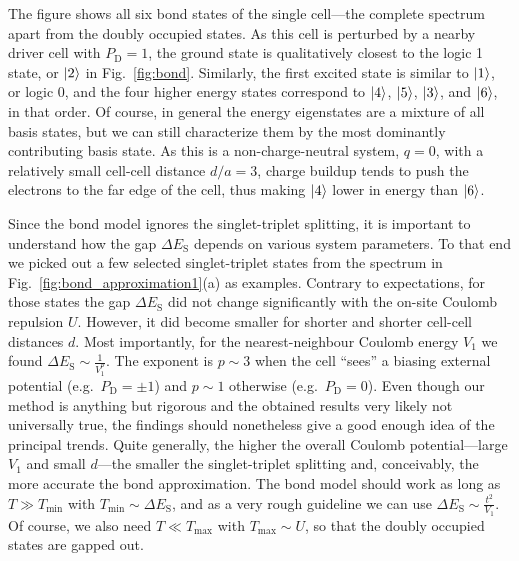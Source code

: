 The figure shows all six bond states of the single cell---the complete spectrum
apart from the doubly occupied states. As this cell is perturbed by a nearby
driver cell with $P_\text{D} = 1$, the ground state is qualitatively closest to the
logic 1 state, or $\left|2\right>$ in Fig.~\ref{fig:bond}. Similarly, the first excited
state is similar to $\left|1\right>$, or logic 0, and the four higher energy states
correspond to $\left|4\right>$, $\left|5\right>$, $\left|3\right>$, and $\left|6\right>$, in that order. Of
course, in general the energy eigenstates are a mixture of all basis states, but
we can still characterize them by the most dominantly contributing basis state.
As this is a non-charge-neutral system, $q=0$, with a relatively small cell-cell
distance $d/a = 3$, charge buildup tends to push the electrons to the far edge
of the cell, thus making $\left|4\right>$ lower in energy than $\left|6\right>$.

Since the bond model ignores the singlet-triplet splitting, it is important to
understand how the gap $\Delta E_\text{S}$ depends on various system parameters. To
that end we picked out a few selected singlet-triplet states from the spectrum
in Fig.~\ref{fig:bond_approximation1}(a) as examples. Contrary to expectations,
for those states the gap $\Delta E_\text{S}$ did not change significantly with the
on-site Coulomb repulsion $U$. However, it did become smaller for shorter and
shorter cell-cell distances $d$. Most importantly, for the nearest-neighbour
Coulomb energy $V_1$ we found $\Delta E_\text{S} \sim \frac{1}{V_1^p}$. The exponent is
$p \sim 3$ when the cell ``sees'' a biasing external potential (e.g.\ $P_\text{D} = \pm
1$) and $p \sim 1$ otherwise (e.g.\ $P_\text{D} = 0$). Even though our method is
anything but rigorous and the obtained results very likely not universally true,
the findings should nonetheless give a good enough idea of the principal trends.
Quite generally, the higher the overall Coulomb potential---large $V_1$ and
small $d$---the smaller the singlet-triplet splitting and, conceivably, the more
accurate the bond approximation. The bond model should work as long as $T \gg
T_{\textrm{min}}$ with $T_{\textrm{min}} \sim \Delta E_\text{S}$, and as a very rough
guideline we can use $\Delta E_\text{S} \sim \frac{t^2}{V_1}$. Of course, we also need
$T \ll T_{\textrm{max}}$ with $T_{\textrm{max}} \sim U$, so that the doubly
occupied states are gapped out.


